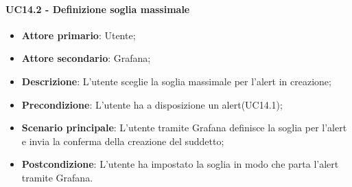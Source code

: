 \paragraph{UC14.2 - Definizione soglia massimale}
\label{para:uc14.2}
\begin{itemize}
  \item \textbf{Attore primario}: Utente;
  \item \textbf{Attore secondario}: Grafana;
  \item \textbf{Descrizione}: L'utente sceglie la soglia massimale per l'alert in creazione;
  \item \textbf{Precondizione}: L'utente ha a disposizione un alert(UC14.1);
  \item \textbf{Scenario principale}: L'utente tramite Grafana definisce la soglia per l'alert e invia la conferma della creazione del suddetto;
  \item \textbf{Postcondizione}: L'utente ha impostato la soglia in modo che parta l'alert tramite Grafana.
\end{itemize}
